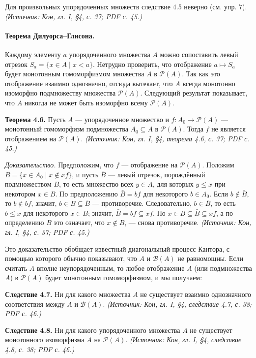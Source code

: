 \documentclass[a4paper,12pt]{article}
\begin{document}
Для произвольных упорядоченных множеств следствие 4.5 неверно (см. упр. 7).
\textit{(Источник: Кон, гл. I, §4, с. 37; PDF с. 45.)}

\paragraph{Теорема Дилуорса--Глисона.}
Каждому элементу \(a\) упорядоченного множества \(A\) можно сопоставить левый отрезок \(S_a=\{x\in A\mid x<a\}\). Нетрудно проверить, что отображение \(a\mapsto S_a\) будет монотонным гомоморфизмом множества \(A\) в \(\mathcal{P}(A)\). Так как это отображение взаимно однозначно, отсюда вытекает, что \(A\) всегда монотонно изоморфно подмножеству множества \(\mathcal{P}(A)\). Следующий результат показывает, что \(A\) никогда не может быть изоморфно всему \(\mathcal{P}(A)\).

\textbf{Теорема 4.6.} Пусть \(A\) — упорядоченное множество и \(f\colon A_0\to\mathcal{P}(A)\) — монотонный гомоморфизм подмножества \(A_0\subseteq A\) в \(\mathcal{P}(A)\). Тогда \(f\) не является отображением на \(\mathcal{P}(A)\).
\textit{(Источник: Кон, гл. I, §4, теорема 4.6, с. 37; PDF с. 45.)}

\emph{Доказательство.} Предположим, что \(f\) — отображение на \(\mathcal{P}(A)\). Положим \(B=\{x\in A_0\mid x\notin xf\}\), и пусть \(\bar B\) — левый отрезок, порождённый подмножеством \(B\), то есть множество всех \(y\in A\), для которых \(y\le x\) при некотором \(x\in B\). По предположению \(\bar B=bf\) для некоторого \(b\in A_0\). Если \(b\notin\bar B\), то \(b\notin bf\), значит, \(b\in B\subseteq\bar B\) — противоречие. Следовательно, \(b\in\bar B\), то есть \(b\le x\) для некоторого \(x\in B\); значит, \(\bar B=bf\subseteq xf\). Но \(x\in B\subseteq\bar B\subseteq xf\), а по определению \(B\) это означает, что \(x\notin B\), — снова противоречие.
\textit{(Источник: Кон, гл. I, §4, с. 37; PDF с. 45.)}

Это доказательство обобщает известный диагональный процесс Кантора, с помощью которого обычно показывают, что \(A\) и \(\mathcal{B}(A)\) не равномощны. Если считать \(A\) вполне неупорядоченным, то любое отображение \(A\) (или подмножества \(A\)) в \(\mathcal{P}(A)\) будет монотонным гомоморфизмом, и мы получаем:

\textbf{Следствие 4.7.} Ни для какого множества \(A\) не существует взаимно однозначного соответствия между \(A\) и \(\mathcal{B}(A)\).
\textit{(Источник: Кон, гл. I, §4, следствие 4.7, с. 38; PDF с. 46.)}

\textbf{Следствие 4.8.} Ни для какого упорядоченного множества \(A\) не существует монотонного изоморфизма \(A\) на \(\mathcal{P}(A)\).
\textit{(Источник: Кон, гл. I, §4, следствие 4.8, с. 38; PDF с. 46.)}
\end{document}
